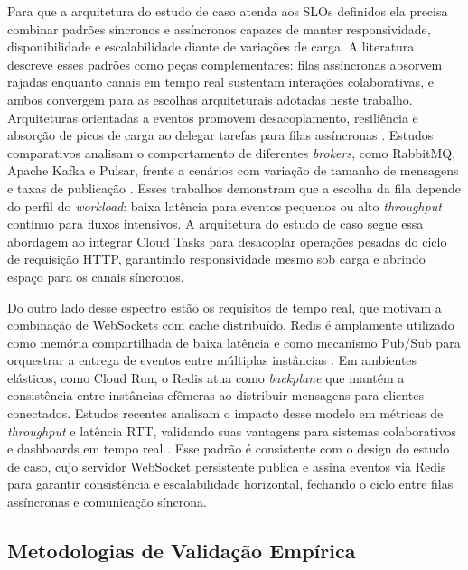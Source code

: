 Para que a arquitetura do estudo de caso atenda aos SLOs definidos ela precisa combinar
padrões síncronos e assíncronos capazes de manter responsividade, disponibilidade
e escalabilidade diante de variações de carga. A literatura descreve esses padrões
como peças complementares: filas assíncronas absorvem rajadas enquanto canais em
tempo real sustentam interações colaborativas, e ambos convergem para as escolhas
arquiteturais adotadas neste trabalho. Arquiteturas orientadas a eventos promovem
desacoplamento, resiliência e absorção de picos de carga ao delegar tarefas para
filas assíncronas \cite{confluent_eda_2024}. Estudos comparativos analisam o comportamento
de diferentes \textit{brokers}, como RabbitMQ, Apache Kafka e Pulsar,
frente a cenários com variação de tamanho de mensagens e taxas de publicação
\cite{thepphakan_pulsar_rabbitmq_2025}. Esses trabalhos demonstram que a escolha da
fila depende do perfil do \textit{workload}: baixa latência para eventos pequenos ou alto \textit{throughput}
contínuo para fluxos intensivos. A arquitetura do estudo de caso segue essa abordagem
ao integrar Cloud Tasks para desacoplar operações pesadas do ciclo de requisição HTTP,
garantindo responsividade mesmo sob carga e abrindo espaço para os canais síncronos.

Do outro lado desse espectro estão os requisitos de tempo real,
que motivam a combinação de WebSockets com cache distribuído.
Redis é amplamente utilizado como memória compartilhada de baixa latência
e como mecanismo Pub/Sub para orquestrar a entrega de eventos entre múltiplas instâncias
\cite{yadav_redis_leaderboard_2019}. Em ambientes elásticos, como Cloud Run,
o Redis atua como \textit{backplane} que mantém a consistência entre instâncias efêmeras
ao distribuir mensagens para clientes conectados. Estudos recentes analisam o impacto desse modelo
em métricas de \textit{throughput} e latência RTT, validando suas vantagens para sistemas colaborativos e
dashboards em tempo real \cite{fernando_websocket_2025, twine_websocket_scaling_2022}.
Esse padrão é consistente com o design do estudo de caso, cujo servidor WebSocket
persistente publica e assina eventos via Redis para garantir consistência e
escalabilidade horizontal, fechando o ciclo entre filas assíncronas e comunicação síncrona.

\subsection{Metodologias de Validação Empírica}
\label{sec:metodologias_validacao}

